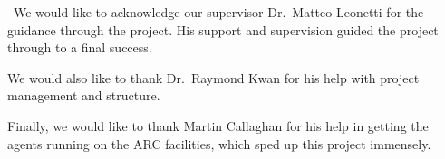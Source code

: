 \noindent\
We would like to acknowledge our supervisor Dr.\ Matteo Leonetti for the guidance
through the project. His support and supervision guided the project through to a
final success.

We would also like to thank Dr.\ Raymond Kwan for his help with project
management and structure.

Finally, we would like to thank Martin Callaghan for his help in getting the
agents running on the ARC facilities, which sped up this project immensely.
